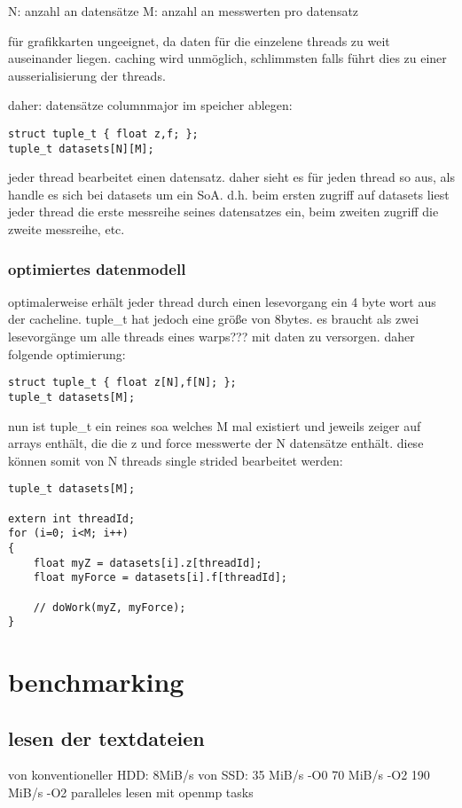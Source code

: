N: anzahl an datensätze
M: anzahl an messwerten pro datensatz

für grafikkarten ungeeignet, da daten für die einzelene threads zu weit auseinander liegen. caching wird unmöglich, schlimmsten falls führt dies zu einer ausserialisierung der threads.

daher: datensätze columnmajor im speicher ablegen:

\begin{lstlisting}
struct tuple_t { float z,f; };
tuple_t datasets[N][M];
\end{lstlisting}

jeder thread bearbeitet einen datensatz. daher sieht es für jeden thread so aus, als handle es sich bei datasets um ein SoA. d.h. beim ersten zugriff auf datasets liest jeder thread die erste messreihe seines datensatzes ein, beim zweiten zugriff die zweite messreihe, etc.

\subsection{optimiertes datenmodell}
optimalerweise erhält jeder thread durch einen lesevorgang ein 4 byte wort aus der cacheline. tuple_t hat jedoch eine größe von 8bytes. es braucht als zwei lesevorgänge um alle threads eines warps??? mit daten zu versorgen.
daher folgende optimierung:

\begin{lstlisting}
struct tuple_t { float z[N],f[N]; };
tuple_t datasets[M];
\end{lstlisting}

nun ist tuple_t ein reines soa welches M mal existiert und jeweils zeiger auf arrays enthält, die die z und force messwerte der N datensätze enthält. diese können somit von N threads single strided bearbeitet werden:

\begin{lstlisting}
tuple_t datasets[M];

extern int threadId;
for (i=0; i<M; i++)
{
    float myZ = datasets[i].z[threadId];
    float myForce = datasets[i].f[threadId];
    
    // doWork(myZ, myForce);
}
\end{lstlisting}

\chapter{benchmarking}
\section{lesen der textdateien}
von konventioneller HDD: 8MiB/s
von SSD:  35 MiB/s -O0
70 MiB/s -O2
190 MiB/s -O2 paralleles lesen mit openmp tasks
